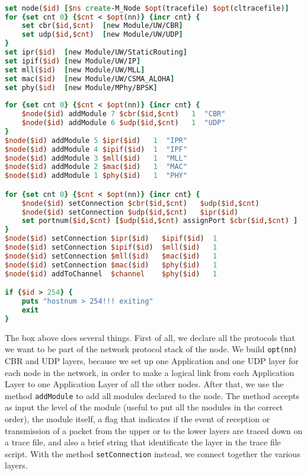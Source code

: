 \documentclass[11pt]{article}
\begin{document}
{\scriptsize\tt
\begin{lstlisting}[language=tcl]
set node($id) [$ns create-M_Node $opt(tracefile) $opt(cltracefile)] 
for {set cnt 0} {$cnt < $opt(nn)} {incr cnt} {
    set cbr($id,$cnt)  [new Module/UW/CBR] 
    set udp($id,$cnt)  [new Module/UW/UDP]
}
set ipr($id)  [new Module/UW/StaticRouting]
set ipif($id) [new Module/UW/IP]
set mll($id)  [new Module/UW/MLL] 
set mac($id)  [new Module/UW/CSMA_ALOHA] 
set phy($id)  [new Module/MPhy/BPSK]  
	
for {set cnt 0} {$cnt < $opt(nn)} {incr cnt} {
    $node($id) addModule 7 $cbr($id,$cnt)   1  "CBR"
    $node($id) addModule 6 $udp($id,$cnt)   1  "UDP"
}
$node($id) addModule 5 $ipr($id)   1  "IPR"
$node($id) addModule 4 $ipif($id)  1  "IPF"   
$node($id) addModule 3 $mll($id)   1  "MLL"
$node($id) addModule 2 $mac($id)   1  "MAC"
$node($id) addModule 1 $phy($id)   1  "PHY"

for {set cnt 0} {$cnt < $opt(nn)} {incr cnt} {
    $node($id) setConnection $cbr($id,$cnt)   $udp($id,$cnt)
    $node($id) setConnection $udp($id,$cnt)   $ipr($id)
    set portnum($id,$cnt) [$udp($id,$cnt) assignPort $cbr($id,$cnt) ]
}
$node($id) setConnection $ipr($id)   $ipif($id)  1
$node($id) setConnection $ipif($id)  $mll($id)   1
$node($id) setConnection $mll($id)   $mac($id)   1
$node($id) setConnection $mac($id)   $phy($id)   1
$node($id) addToChannel  $channel    $phy($id)   1

if {$id > 254} {
    puts "hostnum > 254!!! exiting"
    exit
}
\end{lstlisting}
}
\vspace{\baselinestretch\baselineskip}
The box above does several things. First of all, we declare all the protocols that we want to be part of the network protocol stack of the node. 
We build {\tt opt(nn)} CBR and UDP layers, because we set up one Application and one UDP layer for each node in the network, in order to make a logical link from each Application Layer to one Application Layer of all the other nodes.
After that, we use the method {\tt addModule} to add all modules declared to the node.
The method accepts as input the level of the module (useful to put all the modules in the correct order), the module itself, a flag that indicates if the event of reception or transmission of a packet from the upper or to the lower layers are traced down on a trace file, and also a brief string that identificate the layer in the trace file script. 
With the method {\tt setConnection} instead, we connect together the various layers.\\
\end{document}
